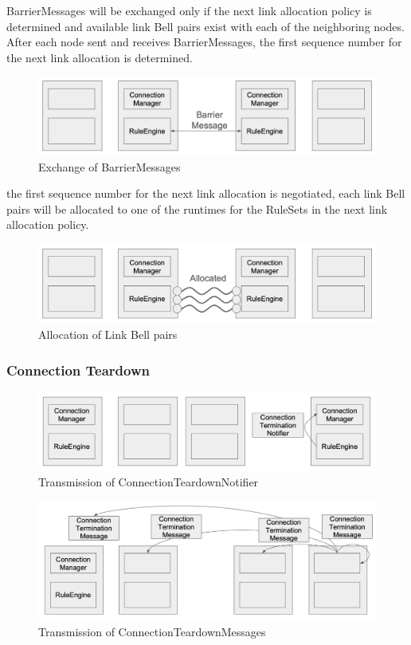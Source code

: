 BarrierMessages will be exchanged only if the next link allocation policy is determined and available link Bell pairs exist with each of the neighboring nodes.
After each node sent and receives BarrierMessages, the first sequence number for the next link allocation is determined.
\begin{figure}[H]
  \centerline{\includegraphics[width=\columnwidth]{images/barrier_negotiation.png}}
  \caption{Exchange of BarrierMessages}
\end{figure}

the first sequence number for the next link allocation is negotiated, each link Bell pairs will be allocated to one of the runtimes for the RuleSets in the next link allocation policy.
\begin{figure}[H]
  \centerline{\includegraphics[width=\columnwidth]{images/link_allocation.png}}
  \caption{Allocation of Link Bell pairs}
\end{figure}

\subsubsection{Connection Teardown}


\begin{figure}[H]
  \centerline{\includegraphics[width=\columnwidth]{images/connection_teardown_notifier.png}}
  \caption{Transmission of ConnectionTeardownNotifier}
\end{figure}

\begin{figure}[H]
  \centerline{\includegraphics[width=\columnwidth]{images/connection_teardown_message.png}}
  \caption{Transmission of ConnectionTeardownMessages}
\end{figure}

